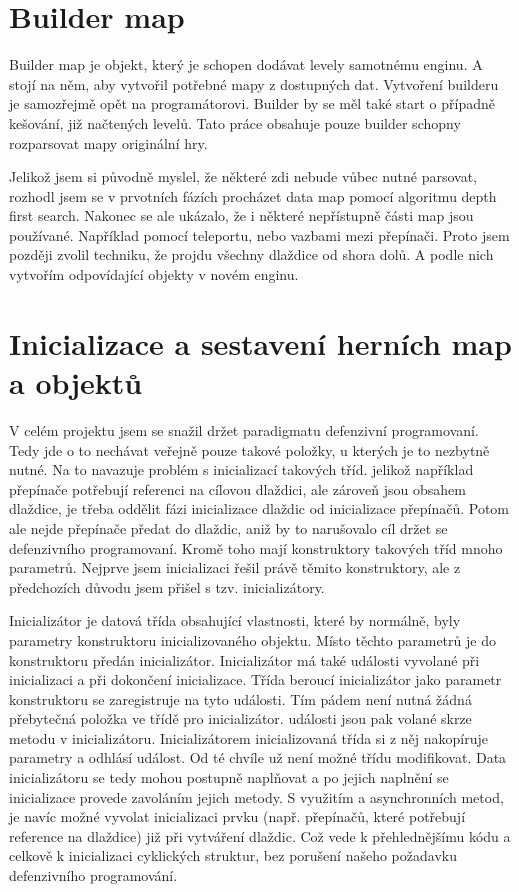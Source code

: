 \section{Builder map}
Builder map je objekt, který je schopen dodávat levely samotnému enginu. A stojí na něm, aby vytvořil potřebné mapy z dostupných dat.
Vytvoření builderu je samozřejmě opět na programátorovi. Builder by se měl také start o případně kešování, již načtených levelů. 
Tato práce obsahuje pouze builder schopny rozparsovat mapy originální hry.

Jelikož jsem si původně myslel, že některé zdi nebude vůbec nutné parsovat, rozhodl jsem se v prvotních fázích procházet data map
pomocí algoritmu depth first search. Nakonec se ale ukázalo, že i některé nepřístupně části map jsou používané. 
Například pomocí teleportu, nebo vazbami mezi přepínači. Proto jsem později zvolil techniku, že projdu všechny dlaždice od shora dolů. 
A podle nich vytvořím odpovídající objekty v novém enginu.

\section{Inicializace a sestavení herních map a objektů}
V celém projektu jsem se snažil držet paradigmatu defenzivní programovaní. Tedy jde o to nechávat veřejně pouze takové položky, u kterých
je to nezbytně nutné. Na to navazuje problém s inicializací takových tříd. jelikož například přepínače potřebují referenci na cílovou dlaždici, ale zároveň
jsou obsahem dlaždice, je třeba oddělit fázi inicializace dlaždic od inicializace přepínačů. Potom ale nejde přepínače předat do dlaždic,
aniž by to narušovalo cíl držet se defenzivního programovaní. Kromě toho mají konstruktory takových tříd mnoho parametrů. Nejprve jsem 
inicializaci řešil právě těmito konstruktory, ale z předchozích důvodu jsem přišel s tzv. inicializátory.

Inicializátor je datová třída obsahující vlastnosti, které by normálně, byly parametry konstruktoru inicializovaného objektu.
Místo těchto parametrů je do konstruktoru předán inicializátor. Inicializátor má také události vyvolané
při inicializaci a při dokončení inicializace. Třída beroucí inicializátor jako parametr konstruktoru se zaregistruje na tyto události.
Tím pádem není nutná žádná přebytečná položka ve třídě pro inicializátor. události jsou pak volané skrze metodu v inicializátoru.
Inicializátorem inicializovaná třída si z něj nakopíruje parametry a odhlásí událost. Od té chvíle už není možné třídu modifikovat.
Data inicializátoru se tedy mohou postupně naplňovat a po jejich naplnění se inicializace provede zavoláním jejich metody.
S využitím a asynchronních metod, je navíc možné vyvolat inicializaci prvku (např. přepínačů, které potřebují reference na dlaždice) 
již při vytváření dlaždic. Což vede k přehlednějšímu kódu a celkově k inicializaci cyklických struktur, bez porušení našeho
požadavku defenzivního programování.

